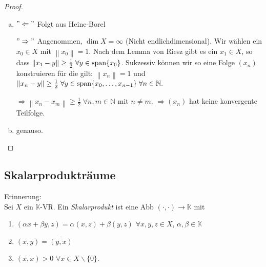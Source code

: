 \documentclass[ngerman]{report}
\theoremstyle{plain}%
\theoremstyle{definition}%
\theoremstyle{myStyle}
\newcommand{\N}{\mathbb{N}}
\newcommand{\K}{\mathbb{K}}
\newcommand{\aufspan}{\textnormal{span}}
\newcommand{\norm}[1]{\left \|#1\right\| }
\newcommand{\df}[1][]{%
	\overset{#1}{\Rightarrow}
}
\newcommand{\ov}[1]{\overline{#1}}
\begin{document}
	\begin{proof}
		 \begin{enumerate}[a)]
			 \item $"\Leftarrow"$ Folgt aus Heine-Borel\par
				$"\Rightarrow"$ Angenommen, $\dim X = \infty$ (Nicht endlichdimensional). 
				Wir wählen ein $x_0 \in X$ mit $\norm{x_0} = 1$. Nach dem Lemma von Riesz gibt es ein $x_1 \in X$, so dass 
				$\norm{x_1 - y} \geq \frac{1}{2} \; \forall y \in \aufspan\{x_0\}$. 
				Sukzessiv können wir so eine Folge $(x_n)$ konstruieren für die gilt: $\norm{x_n} = 1$ und $\norm{x_n - y} \geq \frac{1}{2} \; \forall y\in \aufspan\{x_0,\dots,x_{n-1}\}\; \forall n\in\N.$ \par
				$\df \norm{x_n - x_m} \geq \frac{1}{2}\; \forall n,m \in \N$  mit $n \not = m$. 
				$\df (x_n)$ hat keine konvergente Teilfolge. \par
			\item genauso.
		\end{enumerate}
	\end{proof}

	\subsection{Skalarprodukträume}
Erinnerung:\\
	Sei $X$ ein $\K$-VR. Ein \textit{Skalarprodukt} ist eine Abb $(\cdot,\cdot) \to \K$ mit 
	\begin{enumerate}[(S1)]
		\item $(\alpha x + \beta y, z) = \alpha (x,z) + \beta (y,z)$ $\forall x,y,z \in X$, $\alpha,\beta \in \K$
		\item $(x,y) = \ov{(y,x)}$
		\item $(x,x) > 0$  $\forall x\in X\backslash\{0\}$.
	\end{enumerate}
\end{document}
